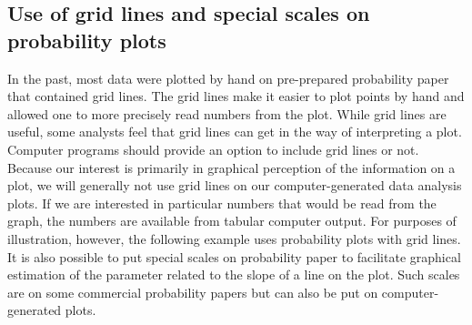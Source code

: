 \subsection{Use of grid lines and special scales on probability plots}
\label{section:grid.lines}
In the past, most data were plotted by hand on pre-prepared
probability paper that contained grid lines. The grid lines make it
easier to plot points by hand and allowed one to more precisely read
numbers from the plot. While grid lines are useful, some analysts feel
that grid lines can get in the way of interpreting a plot. Computer
programs should provide an option to include grid lines or not.
Because our interest is primarily in graphical perception of the
information on a plot, we will generally not use grid lines on our
computer-generated data analysis plots.  If we are interested in
particular numbers that would be read from the graph, the numbers are
available from tabular computer output. For purposes of illustration,
however, the following example uses probability plots with grid lines.
It is also possible to put special scales on probability paper to
facilitate graphical estimation of the parameter related to the slope
of a line on the plot. Such scales are on some commercial probability
papers but can also be put on computer-generated plots.

